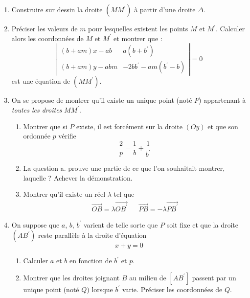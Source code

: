 \begin{enumerate}
 \item Construire sur dessin la droite $(MM^\prime)$ à partir d'une droite $\Delta$.
 \item Préciser les valeurs de $m$ pour lesquelles existent les points $M$ et $M^\prime$. Calculer alors les coordonnées de $M$ et $M^\prime$ et montrer que :
 \begin{displaymath} \left\vert
\begin{array}{ll}
(b+am)x-ab & a(b+b^\prime) \\ 
(b+am)y-abm & -2bb^\prime -am(b^\prime -b)
 \end{array}  \right\vert
= 0
 \end{displaymath}
est une équation de $(MM^\prime)$.
 \item On se propose de montrer qu'il existe un unique point (noté $P$) appartenant à \emph{toutes les droites} $MM^\prime$.
  \begin{enumerate}
 \item Montrer que si $P$ existe, il est forcément sur la droite $(Oy)$ et que son ordonnée  $p$ vérifie 
\begin{displaymath}
 \frac{2}{p} = \frac{1}{b} + \frac{1}{b^\prime} 
\end{displaymath}
 \item La question a. prouve une partie de ce que l'on souhaitait montrer, laquelle ? Achever la démonstration. 

 \item Montrer qu'il existe un réel $\lambda$ tel que
\begin{align*}
 \overrightarrow{OB} = \lambda \overrightarrow{OB^\prime} & & \overrightarrow{PB} = -\lambda \overrightarrow{PB^\prime}
\end{align*}
\end{enumerate}

\item On suppose que $a$, $b$, $b^\prime$ varient de telle sorte que $P$ soit fixe et que la droite $(AB^\prime)$ reste parallèle à la droite d'équation 
\begin{displaymath}
 x + y = 0
\end{displaymath}
\begin{enumerate}
 \item Calculer $a$ et $b$ en fonction de $b^\prime$ et $p$.
 \item Montrer que les droites joignant $B$ au milieu de $[AB^\prime]$ passent par un unique point (noté $Q$) lorsque $b^\prime$ varie. Préciser les coordonnées de $Q$.
\end{enumerate}


\end{enumerate}



